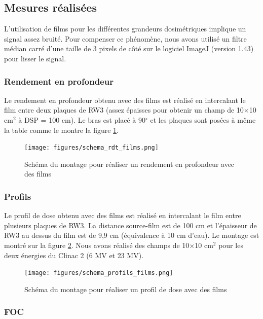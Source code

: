 \documentclass{book}
\begin{document}
\subsection{Mesures réalisées}

L'utilisation de films pour les différentes grandeurs dosimétriques implique un signal assez bruité. Pour compenser ce phénomène, nous avons utilisé un filtre médian carré d'une taille de 3 pixels de côté sur le logiciel ImageJ (version 1.43) pour lisser le signal.

\subsubsection{Rendement en profondeur}

Le rendement en profondeur obtenu avec des films est réalisé en intercalant le film entre deux plaques de RW3 (assez épaisses pour obtenir un champ de 10$\times$10 cm$^2$ à DSP = 100 cm). Le bras est placé à 90$^{\circ}$ et les plaques sont posées à même la table comme le montre la figure \ref*{fig_schema_rdt_films}.

\begin{figure}[h]
  \centering
  \texttt{[image: figures/schema\_rdt\_films.png]}
  \caption{Schéma du montage pour réaliser un rendement en profondeur avec des films}
  \label{fig_schema_rdt_films}
\end{figure}

\subsubsection{Profils}

Le profil de dose obtenu avec des films est réalisé en intercalant le film entre plusieurs plaques de RW3. La distance source-film est de 100 cm et l'épaisseur de RW3 au dessus du film est de 9,9 cm (équivalence à 10 cm d'eau). Le montage est montré sur la figure \ref*{fig_schema_profils_films}. Nous avons réalisé des champs de 10$\times$10 cm$^2$ pour les deux énergies du Clinac 2 (6 MV et 23 MV).

\begin{figure}[h]
  \centering
  \texttt{[image: figures/schema\_profils\_films.png]}
  \caption{Schéma du montage pour réaliser un profil de dose avec des films}
  \label{fig_schema_profils_films}
\end{figure}

\subsubsection{FOC}
\end{document}
